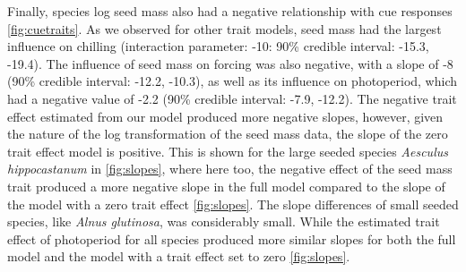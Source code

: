 \documentclass{article}\usepackage[]{graphicx}\usepackage[]{color}
\begin{document}
Finally, species log seed mass also had a negative relationship with cue responses \ref{fig:cuetraits}. As we observed for other trait models, seed mass had the largest influence on chilling  (interaction parameter: -10: 90\% credible interval: -15.3, -19.4). The influence of seed mass on forcing was also negative, with a slope of -8 (90\% credible interval: -12.2, -10.3), as well as its influence on photoperiod, which had a negative value of -2.2 (90\% credible interval: -7.9, -12.2). The negative trait effect estimated from our model produced more negative slopes, however, given the nature of the log transformation of the seed mass data, the slope of the zero trait effect model is positive. This is shown for the large seeded species \textit{Aesculus hippocastanum} in \ref{fig:slopes}, where here too, the negative effect of the seed mass trait produced a more negative slope in the full model compared to the slope of the model with a zero trait effect \ref{fig:slopes}. The slope differences of small seeded species, like \textit{Alnus glutinosa}, was considerably small. While the estimated trait effect of photoperiod for all species produced more similar slopes for both the full model and the model with a trait effect set to zero \ref{fig:slopes}.
\end{document}
